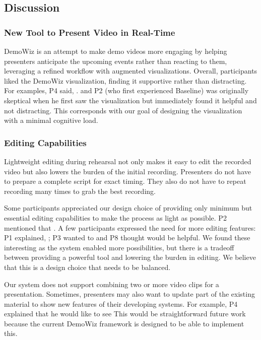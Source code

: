 \subsection{Discussion}

\subsubsection{New Tool to Present Video in Real-Time}
DemoWiz is an attempt to make demo videos more engaging by helping presenters anticipate the upcoming events rather than reacting to them, leveraging a refined workflow with augmented visualizations. Overall, participants liked the DemoWiz visualization, finding it supportive rather than distracting. For examples, P4 said, . and P2 (who first experienced Baseline) was originally skeptical when he first saw the visualization but immediately found it helpful and not distracting. This corresponds with our goal of designing the visualization with a minimal cognitive load.

\subsubsection{Editing Capabilities}
Lightweight editing during rehearsal not only makes it easy to edit the recorded video but also lowers the burden of the initial recording. Presenters do not have to prepare a complete script for exact timing. They also do not have to repeat recording many times to grab the best recording.

Some participants appreciated our design choice of providing only minimum but essential editing capabilities to make the process as light as possible. P2 mentioned that . A few participants expressed the need for more editing features: P1 explained, ; P3 wanted to  and P8 thought  would be helpful. We found these interesting as the system enabled more possibilities, but there is a tradeoff between providing a powerful tool and lowering the burden in editing. We believe that this is a design choice that needs to be balanced.

Our system does not support combining two or more video clips for a presentation. Sometimes, presenters may also want to update part of the existing material to show new features of their developing systems. For example, P4 explained that he would like to see  This would be straightforward future work because the current DemoWiz framework is designed to be able to implement this.

